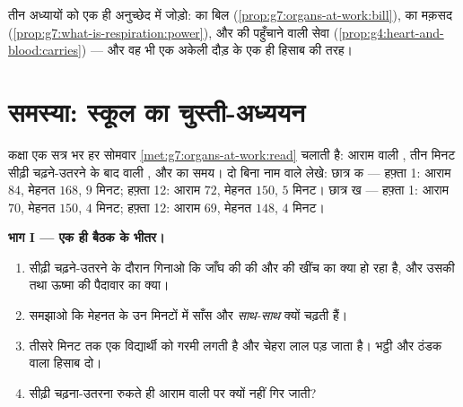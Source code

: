 \begin{exercise}[$\star\star\star$]\label{exo:g7:organs-at-work:12}
तीन अध्यायों को एक ही अनुच्छेद में जोड़ो:  का बिल
(\cref{prop:g7:organs-at-work:bill}),  का मक़सद
(\cref{prop:g7:what-is-respiration:power}), और  की पहुँचाने वाली
सेवा (\cref{prop:g4:heart-and-blood:carries}) --- और वह भी एक अकेली
दौड़ के एक ही हिसाब की तरह।
\end{exercise}

\section{समस्या: स्कूल का चुस्ती-अध्ययन}

\begin{problem}\label{pb:g7:organs-at-work:1}
कक्षा एक सत्र भर हर सोमवार \cref{met:g7:organs-at-work:read} चलाती है:
आराम वाली , तीन मिनट सीढ़ी चढ़ने-उतरने के बाद वाली , और 
का समय। दो बिना नाम वाले लेखे: छात्र क --- हफ़्ता 1: आराम $84$, मेहनत
$168$,  $9$ मिनट; हफ़्ता 12: आराम $72$, मेहनत $150$,  $5$
मिनट। छात्र ख --- हफ़्ता 1: आराम $70$, मेहनत $150$,  $4$ मिनट;
हफ़्ता 12: आराम $69$, मेहनत $148$,  $4$ मिनट।

\medskip\noindent\textbf{भाग I --- एक ही बैठक के भीतर।}
\begin{enumerate}
  \item सीढ़ी चढ़ने-उतरने के दौरान गिनाओ कि जाँघ की  की  और
         की खींच का क्या हो रहा है, और उसकी 
        तथा ऊष्मा की पैदावार का क्या।
  \item समझाओ कि मेहनत के उन मिनटों में साँस और  \emph{साथ-साथ}
        क्यों चढ़ती हैं।
  \item तीसरे मिनट तक एक विद्यार्थी को गरमी लगती है और चेहरा लाल पड़
        जाता है। भट्ठी और ठंडक वाला हिसाब दो।
  \item सीढ़ी चढ़ना-उतरना रुकते ही  आराम वाली पर क्यों नहीं गिर
        जाती?
\end{enumerate}


\end{problem}
